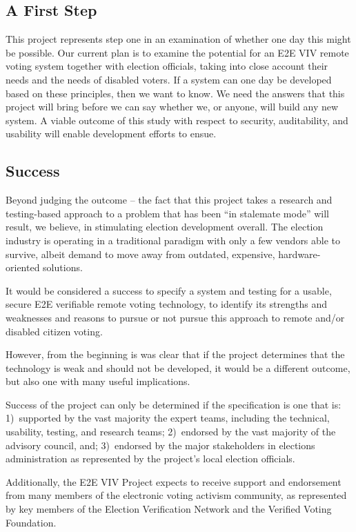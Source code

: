 \subsection{A First Step}

This project represents step one in an examination of whether one day
this might be possible. Our current plan is to examine the potential
for an E2E VIV remote voting system together with election officials,
taking into close account their needs and the needs of disabled
voters. If a system can one day be developed based on these
principles, then we want to know. We need the answers that this
project will bring before we can say whether we, or anyone, will build
any new system. A viable outcome of this study with respect to
security, auditability, and usability will enable development efforts
to ensue.

\subsection{Success}

Beyond judging the outcome – the fact that this project takes a
research and testing-based approach to a problem that has been “in
stalemate mode” will result, we believe, in stimulating election
development overall. The election industry is operating in a
traditional paradigm with only a few vendors able to survive, albeit
demand to move away from outdated, expensive, hardware-oriented
solutions.

It would be considered a success to specify a system and testing for a
usable, secure E2E verifiable remote voting technology, to identify
its strengths and weaknesses and reasons to pursue or not pursue this
approach to remote and/or disabled citizen voting.

However, from the beginning is was clear that if the project
determines that the technology is weak and should not be developed, it
would be a different outcome, but also one with many useful
implications. 

Success of the project can only be determined if the specification is
one that is: 1)~supported by the vast majority the expert teams,
including the technical, usability, testing, and research teams;
2)~endorsed by the vast majority of the advisory council, and;
3)~endorsed by the major stakeholders in elections administration as
represented by the project's local election officials.

Additionally, the E2E VIV Project expects to receive support and
endorsement from many members of the electronic voting activism
community, as represented by key members of the Election Verification
Network and the Verified Voting Foundation.

